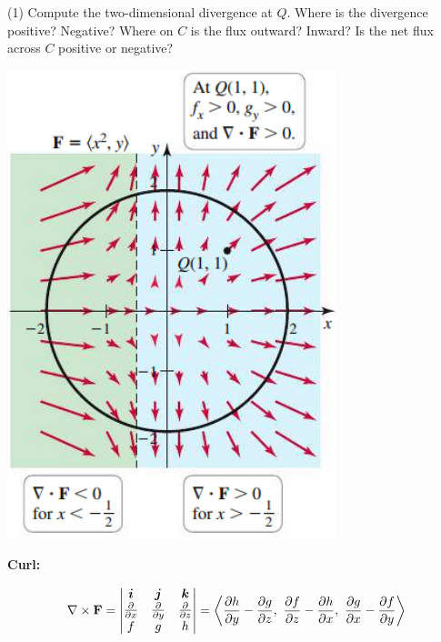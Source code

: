 \documentclass[../mathNotesPreamble]{subfiles}
\begin{document}
  \noindent
  \begin{minipage}[t]{0.55\linewidth}
    \begin{tasks}[after-item-skip=5\baselineskip, label=, item-indent=0pt](1)
      \task 
        Compute the two-dimensional divergence at $Q$.
      \task 
        Where is the divergence positive? Negative?
      \task 
        Where on $C$ is the flux outward? Inward?
      \task 
        Is the net flux across $C$ positive or negative?
    \end{tasks}
  \end{minipage}%
  \begin{minipage}[t]{0.45\linewidth}\mbox{}
    \vspace*{-2\baselineskip}
    \begin{flushright}
      \includegraphics[width=0.75\linewidth]{../images/briggs_17_05/fig17_39}
    \end{flushright}
  \end{minipage}
  \pagebreak

  \noindent
  \textbf{Curl:}

  \[\nabla\times\mathbf F=
      \begin{vmatrix}
        {\bm{i}}& {\bm{j}}& {\bm{k}}\\
        \frac{\partial}{\partial x}& \frac{\partial}{\partial y}& \frac{\partial}{\partial z}\\
        f& g& h
      \end{vmatrix}
      ={\left\langle 
      \frac{\partial h}{\partial y}-\frac{\partial g}{\partial z},\
      \frac{\partial f}{\partial z}-\frac{\partial h}{\partial x},\
      \frac{\partial g}{\partial x}-\frac{\partial f}{\partial y} \right\rangle}
    \]
\end{document}
